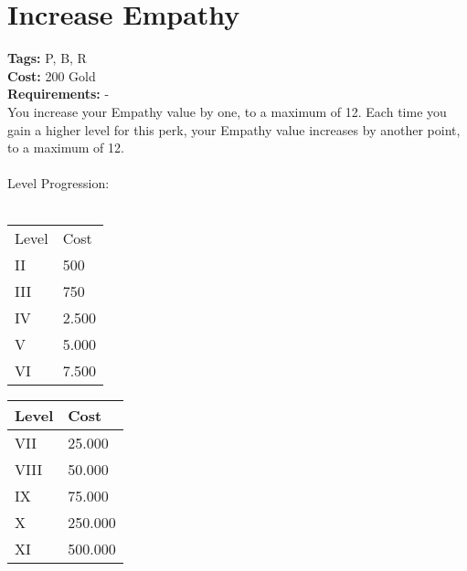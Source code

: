 \section{Increase Empathy}\label{sec:increaseempathy}
\textbf{Tags:} P, B, R\\
\textbf{Cost:} 200 Gold\\
\textbf{Requirements:} -\\
You increase your Empathy value by one, to a maximum of 12.
Each time you gain a higher level for this perk, your Empathy value increases by another point, to a maximum of 12.\\
\\
Level Progression:\\
\\
\begin{minipage}{0.5\textwidth}
    \begin{tabular}{l | l}
        Level & Cost\\
        II & 500\\
        III & 750\\
        IV & 2.500\\
        V & 5.000\\
        VI & 7.500\\
    \end{tabular}
\end{minipage}
\begin{minipage}{0.5\textwidth}
    \begin{tabular}{l | l}
        Level & Cost\\ \hline
        VII & 25.000\\
        VIII & 50.000\\
        IX & 75.000\\
        X & 250.000\\
        XI & 500.000\\
    \end{tabular}
\end{minipage}